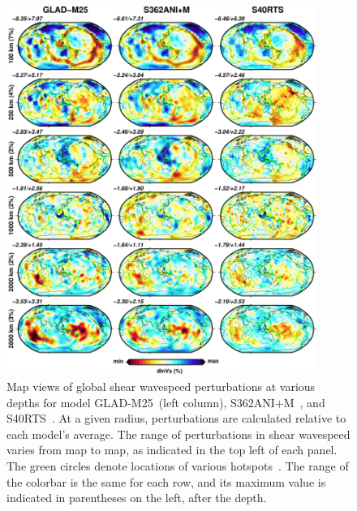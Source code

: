 \documentclass[extra,mreferee]{gji}
\begin{document}
\begin{figure}
  \centering
  \includegraphics[width=0.9\textwidth]{figures/depth_slice/globe_vs.pdf}
  \caption{Map views of global shear wavespeed perturbations at various depths for  model
  GLAD-M25~(left column), S362ANI$+$M~\citep[middle column;][]{moulik2014anisotropic},
  and S40RTS~\citep[right column;][]{ritsema2011s40rts}.
  At a given radius,
  perturbations are calculated relative to each model's average.
  The range of perturbations in shear wavespeed varies from map to map, as indicated in the top left of each panel.
  The green circles denote locations of various
  hotspots~\citep{montelli2006catalogue}.
  The range of the colorbar is the same for each row,
  and its maximum value is indicated in parentheses on the left, after
  the depth.}
  \label{fig:global-vs}
\end{figure}

\end{document}
